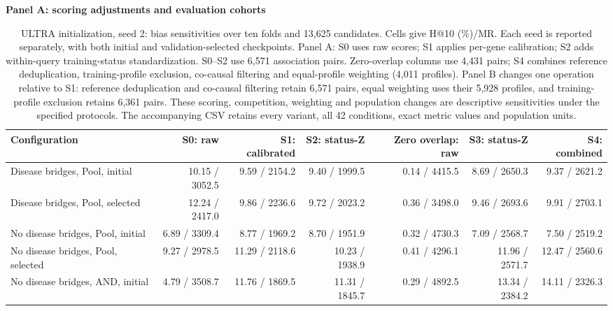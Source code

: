 \begin{landscape}
\begin{table}[p]
\centering\footnotesize
\setlength{\tabcolsep}{3pt}
\caption{ULTRA initialization, seed 2: bias sensitivities over ten folds and 13,625 candidates. Cells give H@10 (\%)/MR. Each seed is reported separately, with both initial and validation-selected checkpoints. Panel A: S0 uses raw scores; S1 applies per-gene calibration; S2 adds within-query training-status standardization. S0--S2 use 6,571 association pairs. Zero-overlap columns use 4,431 pairs; S4 combines reference deduplication, training-profile exclusion, co-causal filtering and equal-profile weighting (4,011 profiles). Panel B changes one operation relative to S1: reference deduplication and co-causal filtering retain 6,571 pairs, equal weighting uses their 5,928 profiles, and training-profile exclusion retains 6,361 pairs. These scoring, competition, weighting and population changes are descriptive sensitivities under the specified protocols. The accompanying CSV retains every variant, all 42 conditions, exact metric values and population units.}
\label{tab:controlled_bias_ultra-4g-seed2}
\textbf{Panel A: scoring adjustments and evaluation cohorts}\par\smallskip
\begin{adjustbox}{max width=\linewidth}
\begin{tabular}{lrrrrrr}
\toprule
Configuration & S0: raw & S1: calibrated & S2: status-Z & Zero overlap: raw & S3: status-Z & S4: combined \\
\midrule
Disease bridges, Pool, initial & 10.15 / 3052.5 & 9.59 / 2154.2 & 9.40 / 1999.5 & 0.14 / 4415.5 & 8.69 / 2650.3 & 9.37 / 2621.2 \\
Disease bridges, Pool, selected & 12.24 / 2417.0 & 9.86 / 2236.6 & 9.72 / 2023.2 & 0.36 / 3498.0 & 9.46 / 2693.6 & 9.91 / 2703.1 \\
No disease bridges, Pool, initial & 6.89 / 3309.4 & 8.77 / 1969.2 & 8.70 / 1951.9 & 0.32 / 4730.3 & 7.09 / 2568.7 & 7.50 / 2519.2 \\
No disease bridges, Pool, selected & 9.27 / 2978.5 & 11.29 / 2118.6 & 10.23 / 1938.9 & 0.41 / 4296.1 & 11.96 / 2571.7 & 12.47 / 2560.6 \\
No disease bridges, AND, initial & 4.79 / 3508.7 & 11.76 / 1869.5 & 11.31 / 1845.7 & 0.29 / 4892.5 & 13.34 / 2384.2 & 14.11 / 2326.3 \\

\end{tabular}
\end{adjustbox}
\end{table}
\end{landscape}
